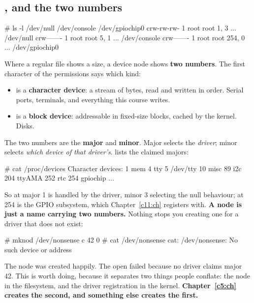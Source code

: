 \subsection{, and the two numbers}
\label{c2:app:b5}

\begin{console}
# ls -l /dev/null /dev/console /dev/gpiochip0
crw-rw-rw-    1 root root    1,   3 ... /dev/null
crw-------    1 root root    5,   1 ... /dev/console
crw-------    1 root root  254,   0 ... /dev/gpiochip0
\end{console}

\noindent Where a regular file shows a size, a device node shows \textbf{two numbers}. The first
character of the permissions says which kind:
\begin{itemize}
  \item {} is a \textbf{character device}: a stream of bytes, read and written in order.
    Serial ports, terminals, and everything this course writes.
  \item {} is a \textbf{block device}: addressable in fixed-size blocks, cached by the kernel.
    Disks.
\end{itemize}
The two numbers are the \textbf{major} and \textbf{minor}. Major selects the \emph{driver}; minor
selects \emph{which device of that driver's}.  lists the claimed majors:

\begin{console}
# cat /proc/devices
Character devices:
  1 mem
  4 tty
  5 /dev/tty
 10 misc
 89 i2c
204 ttyAMA
252 rtc
254 gpiochip
...
\end{console}

\noindent So  at major 1 is handled by the  driver, minor 3 selecting the
null behaviour;  at 254 is the GPIO subsystem, which Chapter~\ref{c11:ch}
registers with. \textbf{A node is just a name carrying two numbers.} Nothing stops you creating one
for a driver that does not exist:

\begin{console}
# mknod /dev/nonsense c 42 0
# cat /dev/nonsense
cat: /dev/nonsense: No such device or address
\end{console}

\noindent The node was created happily. The open failed because no driver claims major 42. This is
worth doing, because it separates two things people conflate: the node in the filesystem, and the
driver registration in the kernel. \textbf{Chapter~\ref{c5:ch} creates the second, and something
else creates the first.}

